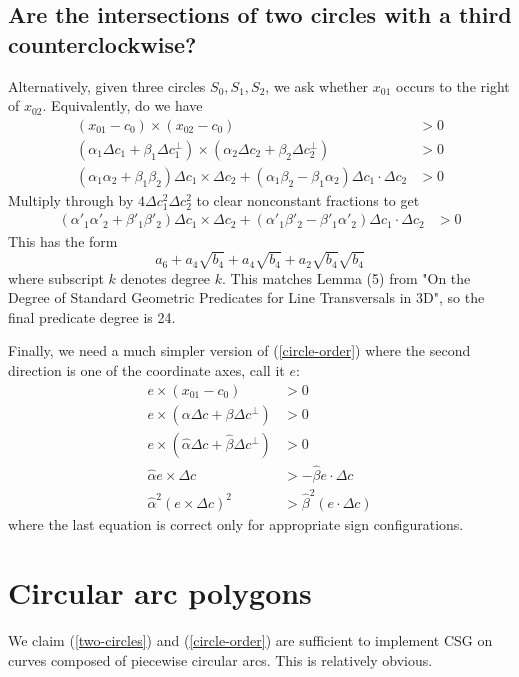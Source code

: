 \documentclass[11pt]{article}
\begin{document}
\subsection{Are the intersections of two circles with a third counterclockwise?}

Alternatively, given three circles $S_0, S_1, S_2$, we ask whether $x_{01}$ occurs to the right of $x_{02}$.  Equivalently, do we have
\begin{align*}
(x_{01} - c_0) \times (x_{02} - c_0) &> 0 \\
(\alpha_1 \Delta c_1 + \beta_1 \Delta c_1^\perp) \times (\alpha_2 \Delta c_2 + \beta_2 \Delta c_2^\perp) &> 0 \\
(\alpha_1 \alpha_2 + \beta_1 \beta_2) \Delta c_1 \times \Delta c_2 + (\alpha_1 \beta_2 - \beta_1 \alpha_2) \Delta c_1 \cdot \Delta c_2 &> 0
\end{align*}
Multiply through by $4 \Delta c_1^2 \Delta c_2^2$ to clear nonconstant fractions to get
\begin{align} \label{circle-order}
(\alpha'_1 \alpha'_2 + \beta'_1 \beta'_2) \Delta c_1 \times \Delta c_2 + (\alpha'_1 \beta'_2 - \beta'_1 \alpha'_2) \Delta c_1 \cdot \Delta c_2 &> 0
\end{align}
This has the form
$$a_6 + a_4 \sqrt{b_4} + a_4 \sqrt{b_4} + a_2 \sqrt{b_4} \sqrt{b_4}$$
where subscript $k$ denotes degree $k$.  This matches Lemma (5) from "On the Degree of Standard Geometric Predicates for Line Transversals in 3D", so the final predicate degree is 24.

Finally, we need a much simpler version of (\ref{circle-order}) where the second direction is one of the coordinate axes, call it $e$:
\begin{align*}
e \times (x_{01} - c_0) &> 0 \\
e \times (\alpha \Delta c + \beta \Delta c^\perp) &> 0 \\
e \times (\hat{\alpha} \Delta c + \hat{\beta} \Delta c^\perp) &> 0 \\
\hat{\alpha} e \times \Delta c &> -\hat{\beta} e \cdot \Delta c \\
\hat{\alpha}^2 (e \times \Delta c)^2 &> \hat{\beta}^2 (e \cdot \Delta c)
\end{align*}
where the last equation is correct only for appropriate sign configurations.

\section{Circular arc polygons}

We claim (\ref{two-circles}) and (\ref{circle-order}) are sufficient to implement CSG on curves composed of piecewise circular arcs.  This is relatively obvious.
\end{document}
